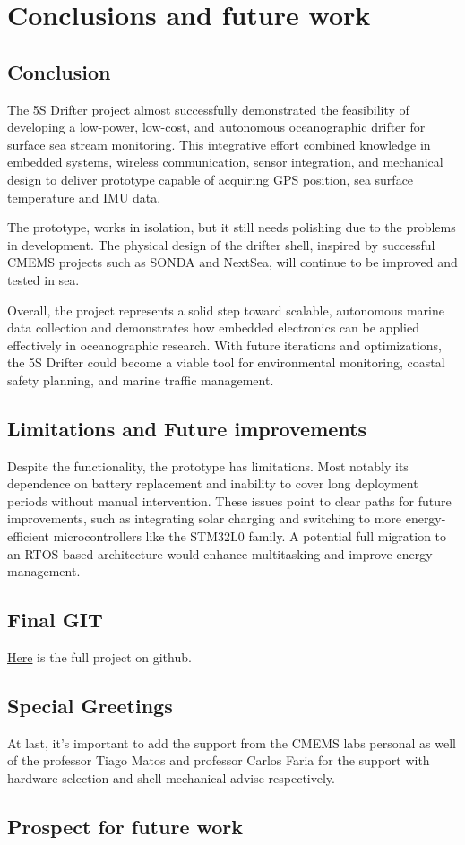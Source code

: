 \chapter{Conclusions and future work}

\section{Conclusion}

The 5S Drifter project almost successfully demonstrated the feasibility of developing a low-power, low-cost, 
and autonomous oceanographic drifter for surface sea stream monitoring. This integrative effort combined
knowledge in embedded systems, wireless communication, sensor integration, and mechanical design to
deliver prototype capable of acquiring GPS position, sea surface temperature and IMU data.

The prototype, works in isolation, but it still needs polishing due to the problems in development.
The physical design of the drifter shell, inspired by successful CMEMS projects such as SONDA and NextSea,
will continue to be improved and tested in sea. 

Overall, the project represents a solid step toward scalable, autonomous marine data collection and 
demonstrates how embedded electronics can be applied effectively in oceanographic research. With future 
iterations and optimizations, the 5S Drifter could become a viable tool for environmental monitoring, 
coastal safety planning, and marine traffic management.


\section{Limitations and Future improvements}
Despite the functionality, the prototype has limitations. Most notably its dependence on battery replacement 
and inability to cover long deployment periods without manual intervention. These issues point to clear 
paths for future improvements, such as integrating solar charging and switching to more energy-efficient 
microcontrollers like the STM32L0 family. A potential full migration to an RTOS-based architecture would 
enhance multitasking and improve energy management.

\section{Final GIT}
\href{https://github.com/viniciuscacarvalho/5S}{Here} is the full project on github.

\section{Special Greetings}
At last, it's important to add the support from the 
CMEMS labs personal as well of the professor Tiago Matos and professor Carlos Faria for the
support with hardware selection and shell mechanical advise respectively.
        

\section{Prospect for future work}
